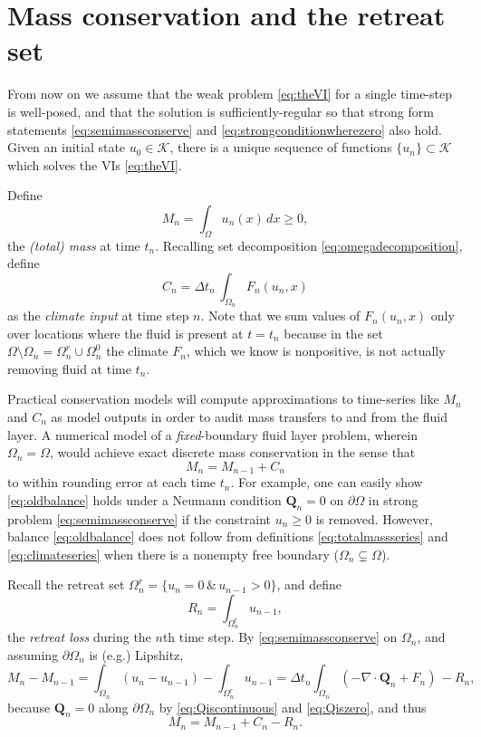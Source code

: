 \documentclass[final,onefignum]{siamart190516}
\newcommand\bQ{\mathbf{Q}}
\newcommand{\Div}{\nabla\cdot}
\begin{document}
\section{Mass conservation and the retreat set}  \label{sec:timeseries}

From now on we assume that the weak problem \eqref{eq:theVI} for a single time-step is well-posed, and that the solution is sufficiently-regular so that strong form statements \eqref{eq:semimassconserve} and \eqref{eq:strongconditionwherezero} also hold.  Given an initial state $u_0\in\mathcal{K}$, there is a unique sequence of functions $\{u_n\} \subset \mathcal{K}$ which solves the VIs \eqref{eq:theVI}.

Define
\begin{equation}
M_n = \int_\Omega u_n(x)\,dx \ge 0, \label{eq:totalmassseries}
\end{equation}
the \emph{(total) mass} at time $t_n$.  Recalling set decomposition \eqref{eq:omegadecomposition}, define
\begin{equation}
C_n = \Delta t_n\, \int_{\Omega_n} F_n(u_n,x) \label{eq:climateseries}
\end{equation}
as the \emph{climate input} at time step $n$.  Note that we sum values of $F_n(u_n,x)$ only over locations where the fluid is present at $t=t_n$ because in the set $\Omega \setminus \Omega_n = \Omega_n^r \cup \Omega_n^0$ the climate $F_n$, which we know is nonpositive, is not actually removing fluid at time $t_n$.

Practical conservation models will compute approximations to time-series like $M_n$ and $C_n$ as model outputs in order to audit mass transfers to and from the fluid layer.  A numerical model of a \emph{fixed}-boundary fluid layer problem, wherein $\Omega_n=\Omega$, would achieve exact discrete mass conservation in the sense that
\begin{equation}
M_n = M_{n-1} + C_n \label{eq:oldbalance}
\end{equation}
to within rounding error at each time $t_n$.  For example, one can easily show \eqref{eq:oldbalance} holds under a Neumann condition $\bQ_n=0$ on $\partial \Omega$ in strong problem \eqref{eq:semimassconserve} if the constraint $u_n\ge 0$ is removed.  However, balance \eqref{eq:oldbalance} does not follow from definitions \eqref{eq:totalmassseries} and \eqref{eq:climateseries} when there is a nonempty free boundary ($\Omega_n \subsetneq \Omega$).

Recall the retreat set $\Omega_n^r=\{u_n = 0 \,\&\,u_{n-1}>0\}$, and define
\begin{equation}
R_n = \int_{\Omega_n^r} u_{n-1}, \label{eq:retreatlossseries}
\end{equation}
the \emph{retreat loss} during the $n$th time step.  By \eqref{eq:semimassconserve} on $\Omega_n$, and assuming $\partial \Omega_n$ is (e.g.) Lipshitz,
    $$M_n - M_{n-1} = \int_{\Omega_n} (u_n - u_{n-1}) - \int_{\Omega_n^r} u_{n-1} = \Delta t_n \int_{\Omega_n} (- \Div \bQ_n + F_n) \, - R_n,$$
because $\bQ_n=0$ along $\partial \Omega_n$ by \eqref{eq:Qiscontinuous} and \eqref{eq:Qiszero}, and thus
\begin{equation}
M_n = M_{n-1} + C_n - R_n. \label{eq:newbalance}
\end{equation}
\end{document}
